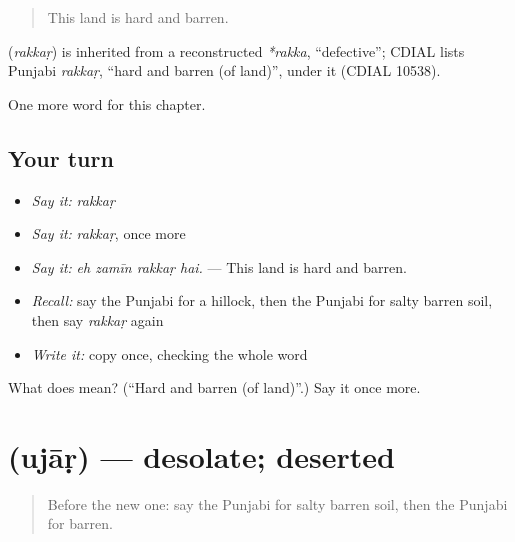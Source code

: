 \begin{quote}
This land is hard and barren.
\end{quote}

\begin{cousinweb}
\textbf{} (\emph{rakkaṛ}) is inherited from a reconstructed \emph{*rakka}, \textquotedblleft{}defective\textquotedblright{}; CDIAL lists Punjabi \emph{rakkaṛ}, \textquotedblleft{}hard and barren (of land)\textquotedblright{}, under it (CDIAL 10538).
\end{cousinweb}

\begin{grammarlens}[title={What you've built}]
One more word for this chapter.
\end{grammarlens}

\subsection*{Your turn}
\begin{itemize}
\raggedright
  \item \emph{Say it:} \emph{rakkaṛ}
  \item \emph{Say it:} \emph{rakkaṛ}, once more
  \item \emph{Say it:} \emph{eh zamīn rakkaṛ hai.} — This land is hard and barren.
  \item \emph{Recall:} say the Punjabi for a hillock, then the Punjabi for salty barren soil, then say \emph{rakkaṛ} again
  \item \emph{Write it:} copy \textbf{} once, checking the whole word
\end{itemize}

\begin{tcolorbox}[breakable,colback=teal!4,colframe=teal!35!black,title={Before you move on}]
What does  mean? (\textquotedblleft{}Hard and barren (of land)\textquotedblright{}.) Say it once more.
\end{tcolorbox}
\section[\texorpdfstring{\pa{ਉਜਾੜ} (ujāṛ)}{ਉਜਾੜ (ujāṛ)}]{ (ujāṛ) — desolate; deserted}

\label{lesson:PA-C294-ujar}



\begin{quote}
Before the new one: say the Punjabi for salty barren soil, then the Punjabi for barren.
\end{quote}

